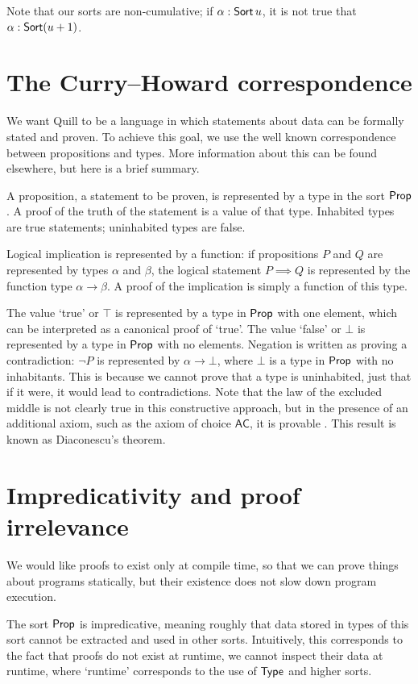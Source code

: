 Note that our sorts are non-cumulative; if \( \alpha : \operatorname{\mathsf{Sort}} u \), it is not true that \( \alpha : \operatorname{\mathsf{Sort}} (u + 1) \).

\section{The Curry--Howard correspondence}
We want Quill to be a language in which statements about data can be formally stated and proven.
To achieve this goal, we use the well known correspondence between propositions and types.
More information about this can be found elsewhere, but here is a brief summary.

A proposition, a statement to be proven, is represented by a type in the sort \( \mathsf{Prop} \).
A proof of the truth of the statement is a value of that type.
Inhabited types are true statements; uninhabited types are false.

Logical implication is represented by a function: if propositions \( P \) and \( Q \) are represented by types \( \alpha \) and \( \beta \), the logical statement \( P \implies Q \) is represented by the function type \( \alpha \to \beta \).
A proof of the implication is simply a function of this type.

The value `true' or \( \top \) is represented by a type in \( \mathsf{Prop} \) with one element, which can be interpreted as a canonical proof of `true'.
The value `false' or \( \bot \) is represented by a type in \( \mathsf{Prop} \) with no elements.
Negation is written as proving a contradiction: \( \neg P \) is represented by \( \alpha \to \bot \), where \( \bot \) is a type in \( \mathsf{Prop} \) with no inhabitants.
This is because we cannot prove that a type is uninhabited, just that if it were, it would lead to contradictions.
Note that the law of the excluded middle is not clearly true in this constructive approach, but in the presence of an additional axiom, such as the axiom of choice \( \mathsf{AC} \), it is provable \cite{Diaconescu1975-df}. This result is known as Diaconescu's theorem.

\section{Impredicativity and proof irrelevance}
We would like proofs to exist only at compile time, so that we can prove things about programs statically, but their existence does not slow down program execution.

The sort \( \mathsf{Prop} \) is impredicative, meaning roughly that data stored in types of this sort cannot be extracted and used in other sorts. Intuitively, this corresponds to the fact that proofs do not exist at runtime, we cannot inspect their data at runtime, where `runtime' corresponds to the use of \( \mathsf{Type} \) and higher sorts.

